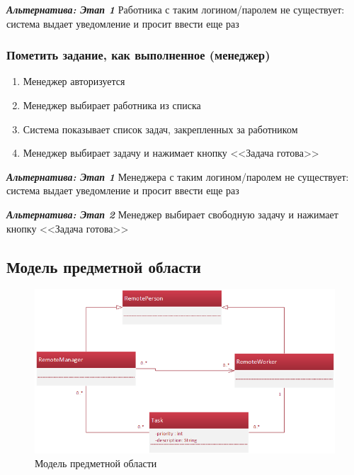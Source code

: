 		\textbf{\textit{Альтернатива: Этап 1}} Работника с таким логином/паролем не существует: система выдает уведомление и просит ввести еще раз
		
	\subsubsection{Пометить задание, как выполненное (менеджер)}
		\begin{enumerate}
			\item	Менеджер авторизуется
			\item	Менеджер выбирает работника из списка
			\item	Система показывает список задач, закрепленных за работником
			\item	Менеджер выбирает задачу и нажимает кнопку <<Задача готова>>						
		\end{enumerate}
		
		\textbf{\textit{Альтернатива: Этап 1}} Менеджера с таким логином/паролем не существует: система выдает уведомление и просит ввести еще раз
		
		\textbf{\textit{Альтернатива: Этап 2}} Менеджер выбирает свободную задачу и нажимает кнопку <<Задача готова>>
		
\subsection{Модель предметной области}
	\begin{figure}[H]
		\centering
		\includegraphics[width=1\textwidth]{../materials/EPDiagram.png}
		\caption{Модель предметной области}
		\label{fig:class_ob}
		\end{figure}